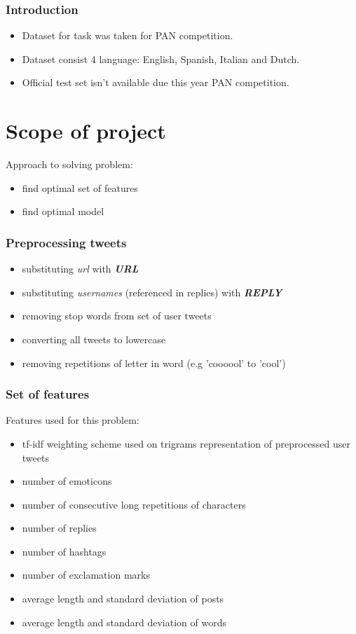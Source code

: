 \documentclass[utf8]{beamer}
\begin{document}

\begin{frame}
	\frametitle{Introduction}
	\begin{itemize}
		\item Dataset for task was taken for PAN competition.
		\item Dataset consist 4 language: English, Spanish, Italian and Dutch.
		\item Official test set isn't available due this year PAN competition.
	\end{itemize}
\end{frame}



\section{Scope of project}
\frame{\tableofcontents[currentsection]}

\begin{frame}
	Approach to solving problem:
	\begin{itemize}
		\item find optimal set of features
		\item find optimal model
	\end{itemize}
\end{frame}

\begin{frame}
	\frametitle{Preprocessing tweets}
	\begin{itemize}
		\item substituting \textit{url} with \textit{\textbf{URL}}
		\item substituting \textit{usernames} (referenced in replies) with \textit{\textbf{REPLY}}
		\item removing stop words from set of user tweets
		\item converting all tweets to lowercase
		\item removing repetitions of letter in word (e.g 'coooool' to 'cool')
	\end{itemize}
\end{frame}

\begin{frame}
	\frametitle{Set of features}
	Features used for this problem:
	\begin{itemize}
		\item tf-idf weighting scheme used on trigrams representation of preprocessed user tweets
		\item number of emoticons
		\item number of consecutive long repetitions of characters
		\item number of replies
		\item number of hashtags
		\item number of exclamation marks
		\item average length and standard deviation of posts
		\item average length and standard deviation of words
	\end{itemize}
\end{frame}
\end{document}
